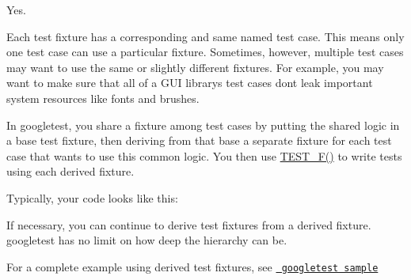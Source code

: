 Yes.

Each test fixture has a corresponding and same named test case. This means only one test case can use a particular fixture. Sometimes, however, multiple test cases may want to use the same or slightly different fixtures. For example, you may want to make sure that all of a G\+UI library\textquotesingle{}s test cases don\textquotesingle{}t leak important system resources like fonts and brushes.

In googletest, you share a fixture among test cases by putting the shared logic in a base test fixture, then deriving from that base a separate fixture for each test case that wants to use this common logic. You then use {\ttfamily \mbox{\hyperlink{googletest-master_2googletest_2include_2gtest_2gtest_8h_a0ee66d464d1a06c20c1929cae09d8758}{T\+E\+S\+T\+\_\+\+F()}}} to write tests using each derived fixture.

Typically, your code looks like this\+:


\begin{DoxyCode}{0}
\DoxyCodeLine{\};}
\DoxyCodeLine{}
\DoxyCodeLine{  \}}
\DoxyCodeLine{}
\DoxyCodeLine{  \}}
\DoxyCodeLine{}
\DoxyCodeLine{\};}
\DoxyCodeLine{}
\DoxyCodeLine{}
\end{DoxyCode}


If necessary, you can continue to derive test fixtures from a derived fixture. googletest has no limit on how deep the hierarchy can be.

For a complete example using derived test fixtures, see \href{https://github.com/google/googletest/blob/master/googletest/samples/sample5_unittest.cc}{\texttt{ googletest sample}}

